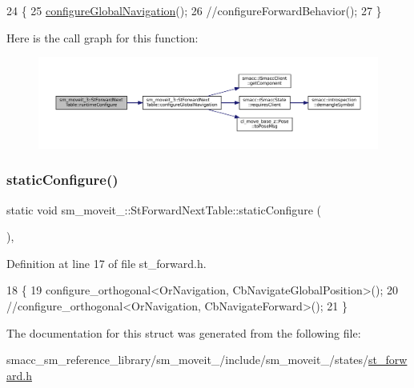 \begin{DoxyCode}
24   \{
25     \hyperlink{structsm__moveit__3_1_1StForwardNextTable_a0027b604f471fad11d66c027a3ef662a}{configureGlobalNavigation}();
26     \textcolor{comment}{//configureForwardBehavior();}
27   \}
\end{DoxyCode}
Here is the call graph for this function\+:
\nopagebreak
\begin{figure}[H]
\begin{center}
\leavevmode
\includegraphics[width=350pt]{structsm__moveit__3_1_1StForwardNextTable_ab6ec25ee10deb9b3da36fc1baf87cd10_cgraph}
\end{center}
\end{figure}
\mbox{\label{structsm__moveit__3_1_1StForwardNextTable_a1cdd0afdc2bd35d9c9fd72a309a28243}} 
\subsubsection{\texorpdfstring{static\+Configure()}{staticConfigure()}}
{\footnotesize\ttfamily static void sm\+\_\+moveit\+\_\+::\+St\+Forward\+Next\+Table\+::static\+Configure (\begin{DoxyParamCaption}{ }\end{DoxyParamCaption})\hspace{0.3cm}{\ttfamily [inline]}, {\ttfamily [static]}}



Definition at line 17 of file st\+\_\+forward.\+h.


\begin{DoxyCode}
18   \{
19      configure\_orthogonal<OrNavigation, CbNavigateGlobalPosition>();
20     \textcolor{comment}{//configure\_orthogonal<OrNavigation, CbNavigateForward>();}
21   \}
\end{DoxyCode}


The documentation for this struct was generated from the following file\+:\begin{DoxyCompactItemize}
\item 
smacc\+\_\+sm\+\_\+reference\+\_\+library/sm\+\_\+moveit\+\_/include/sm\+\_\+moveit\+\_/states/\hyperlink{3_2include_2sm__moveit__3_2states_2st__forward_8h}{st\+\_\+forward.\+h}\end{DoxyCompactItemize}
